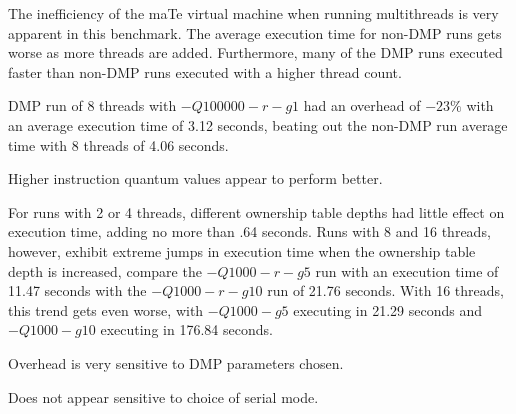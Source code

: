 The inefficiency of the maTe virtual machine when running multithreads
is very apparent in this benchmark.  The average execution time for
non-DMP runs gets worse as more threads are added.  Furthermore, many
of the DMP runs executed faster than non-DMP runs executed with a
higher thread count.

DMP run of 8 threads with $-Q100000 -r -g1$ had an overhead of $-23\%$
with an average execution time of 3.12 seconds, beating out the
non-DMP run average time with 8 threads of 4.06 seconds.

Higher instruction quantum values appear to perform better.

For runs with 2 or 4 threads, different ownership table depths had
little effect on execution time, adding no more than .64 seconds.
Runs with 8 and 16 threads, however, exhibit extreme jumps in
execution time when the ownership table depth is increased, compare
the $-Q1000 -r -g5$ run with an execution time of 11.47 seconds with
the $-Q1000 -r -g10$ run of 21.76 seconds.  With 16 threads, this
trend gets even worse, with $-Q1000 -g5$ executing in 21.29 seconds
and $-Q1000 -g10$ executing in 176.84 seconds.

Overhead is very sensitive to DMP parameters chosen.

Does not appear sensitive to choice of serial mode.

